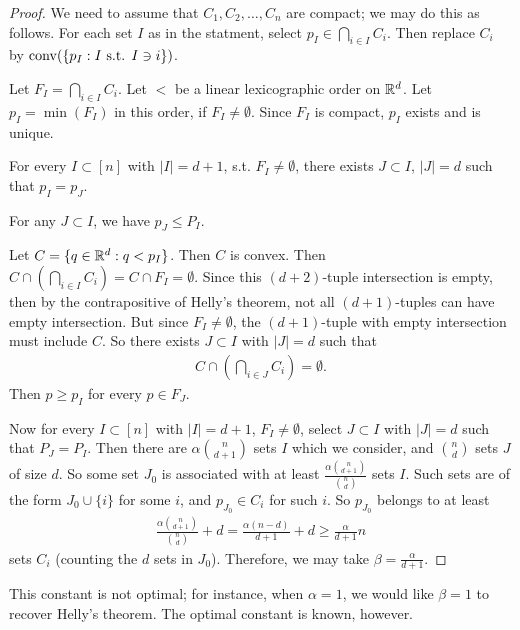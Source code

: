 \begin{proof}	
We need to assume that $C_1,C_2,\dotsc,C_n$ are compact; we may do this as follows. For each set $I$ as in the statment, select $p_I \in \bigcap_{i\in I} C_i$. Then replace $C_i$ by $\operatorname{conv}(\{p_I:  I \text{ s.t. } I\ni i\})$.

Let $F_I = \bigcap_{i\in I} C_i$. Let $<$ be a linear lexicographic order on $\mathbb{R}^d$. Let $p_I= \min (F_I)$ in this order, if $F_I\neq \emptyset$. Since $F_I$ is compact, $p_I$ exists and is unique.

\begin{claim}
For every $I\subset[n]$ with $|I|=d+1$, s.t. $F_I\neq \emptyset$, there exists $J\subset I$, $|J| = d$ such that $p_I = p_J$.
\end{claim}
\begin{remark}
For any $J\subset I$,  we have $p_J \leq P_I$.
\end{remark}
\begin{subproof}
Let $C =  \{q \in \mathbb{R}^d: q< p_I\}$. Then $C$ is convex. Then $C\cap \left( \bigcap_{i\in I} C_i \right) = C\cap F_I = \emptyset$. Since this $(d+2)$-tuple intersection is empty, then by the contrapositive of Helly's theorem, not all $(d+1)$-tuples can have empty intersection. But since $F_I\neq \emptyset$, the $(d+1)$-tuple with empty intersection must include $C$. So there exists $J\subset I$ with $|J| = d$ such that
\begin{align*}	
C \cap \left( \bigcap_{i\in J}C_i \right) = \emptyset.
\end{align*}
Then $p\geq p_I$ for every $p\in F_J$.
\end{subproof}

Now for every $I\subset[n]$ with $|I| = d+1$, $F_I\neq \emptyset$, select $J\subset I$ with $|J| = d$ such that $P_J = P_I$. Then there are $\alpha{n \choose d+1}$ sets $I$ which we consider, and  ${n\choose d}$ sets $J$ of size $d$. So some set $J_0$ is associated with at least $\frac{\alpha {n\choose d+1}}{{n\choose d}}$ sets $I$. Such sets are of the form $J_0 \cup \{ i\}$ for some $i$, and $p_{J_0} \in C_i$ for such $i$. So $p_{J_0}$ belongs to  at least 
\begin{align*}	
\frac{\alpha{ n\choose d+1}}{{n\choose d}} + d = \frac{\alpha(n-d)}{d+1}+d \geq \frac{\alpha}{d+1}n
\end{align*}
sets $C_i$ (counting the $d$ sets in $J_0$).
Therefore, we may take $\beta = \frac{\alpha}{d+1}$.
\end{proof}
\begin{remark}
This constant is not optimal; for instance, when $\alpha=1$, we would like $\beta=1$ to recover Helly's theorem. The optimal constant is known, however.
\end{remark}


